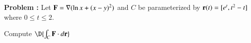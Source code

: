 
{\bf Problem :}  Let \({\bf F}=\nabla (\ln x + (x-y)^2 )\) and  \(C\) be parameterized by ${\bf r}(t)=[ e^t,t^2-t ]$ where $0\le t \le 2$. 

\vspace{0.2cm}

Compute \(\D{\int_C {\bf F}\cdot d{\bf r} }\)

